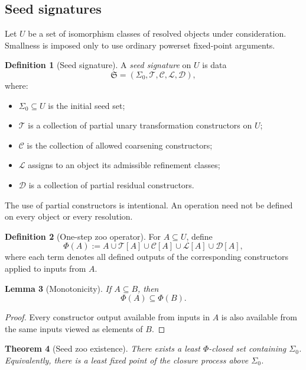 \documentclass[11pt]{article}
\newtheorem{theorem}{Theorem}[section]
\newtheorem{lemma}[theorem]{Lemma}
\theoremstyle{definition}
\newtheorem{definition}[theorem]{Definition}
\theoremstyle{remark}
\newcommand{\Seeds}{\Sigma}
\begin{document}
\subsection{Seed signatures}

Let $U$ be a set of isomorphism classes of resolved objects under consideration. Smallness is imposed only to use ordinary powerset fixed-point arguments.

\begin{definition}[Seed signature]
A \emph{seed signature} on $U$ is data
\[
\mathfrak S=(\Seeds_0,\mathscr T,\mathscr C,\mathscr L,\mathscr D),
\]
where:
\begin{itemize}
    \item $\Seeds_0\subseteq U$ is the initial seed set;
    \item $\mathscr T$ is a collection of partial unary transformation constructors on $U$;
    \item $\mathscr C$ is the collection of allowed coarsening constructors;
    \item $\mathscr L$ assigns to an object its admissible refinement classes;
    \item $\mathscr D$ is a collection of partial residual constructors.
\end{itemize}
\end{definition}

The use of partial constructors is intentional. An operation need not be defined on every object or every resolution.

\begin{definition}[One-step zoo operator]
For $A\subseteq U$, define
\[
\Phi(A):=
A
\cup \mathscr T[A]
\cup \mathscr C[A]
\cup \mathscr L[A]
\cup \mathscr D[A],
\]
where each term denotes all defined outputs of the corresponding constructors applied to inputs from $A$.
\end{definition}

\begin{lemma}[Monotonicity]\label{lem:phi-monotone}
If $A\subseteq B$, then
\[
\Phi(A)\subseteq\Phi(B).
\]
\end{lemma}

\begin{proof}
Every constructor output available from inputs in $A$ is also available from the same inputs viewed as elements of $B$.
\end{proof}

\begin{theorem}[Seed zoo existence]\label{thm:zoo-existence}
There exists a least $\Phi$-closed set containing $\Seeds_0$. Equivalently, there is a least fixed point of the closure process above $\Seeds_0$.
\end{theorem}
\end{document}
